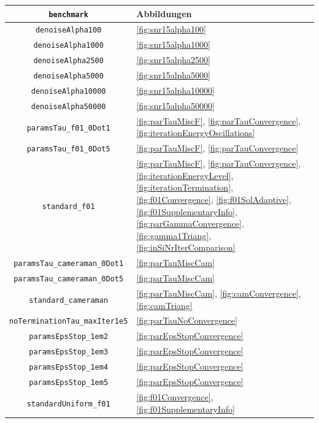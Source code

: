 \begin{table}[p]
  \centering
  \begin{tabular}{c|p{8.7cm}}
    \hline
    \texttt{benchmark} & Abbildungen\\  
    \hline 
    \texttt{denoiseAlpha100} &
    \ref{fig:snr15alpha100}\\
    \texttt{denoiseAlpha1000} &
    \ref{fig:snr15alpha1000}\\
    \texttt{denoiseAlpha2500} &
    \ref{fig:snr15alpha2500}\\
    \texttt{denoiseAlpha5000} &
    \ref{fig:snr15alpha5000}\\
    \texttt{denoiseAlpha10000} &
    \ref{fig:snr15alpha10000}\\
    \texttt{denoiseAlpha50000} &
    \ref{fig:snr15alpha50000}\\
    \texttt{paramsTau\_f01\_0Dot1} &
    \ref{fig:parTauMiscF}, \ref{fig:parTauConvergence},
    \ref{fig:iterationEnergyOscillations}\\
    \texttt{paramsTau\_f01\_0Dot5} &
    \ref{fig:parTauMiscF}, \ref{fig:parTauConvergence}\\
    \texttt{standard\_f01} &
    \ref{fig:parTauMiscF}, \ref{fig:parTauConvergence}, 
    \ref{fig:iterationEnergyLevel}, \ref{fig:iterationTermination},
    \ref{fig:f01Convergence}, \ref{fig:f01SolAdaptive},
    \ref{fig:f01SupplementaryInfo}, \ref{fig:parGammaConvergence},
    \ref{fig:gamma1Triang}, \ref{fig:inSiNrIterComparison}\\
    \texttt{paramsTau\_cameraman\_0Dot1} &
    \ref{fig:parTauMiscCam}\\
    \texttt{paramsTau\_cameraman\_0Dot5} &
    \ref{fig:parTauMiscCam} \\
    \texttt{standard\_cameraman} &
    \ref{fig:parTauMiscCam}, \ref{fig:camConvergence}, \ref{fig:camTriang}\\
    \texttt{noTerminationTau\_maxIter1e5} &
    \ref{fig:parTauNoConvergence}\\
    \texttt{paramsEpsStop\_1em2} &
    \ref{fig:parEpsStopConvergence}\\
    \texttt{paramsEpsStop\_1em3} &
    \ref{fig:parEpsStopConvergence}\\
    \texttt{paramsEpsStop\_1em4} &
    \ref{fig:parEpsStopConvergence}\\
    \texttt{paramsEpsStop\_1em5} &
    \ref{fig:parEpsStopConvergence}\\
    \texttt{standardUniform\_f01} &
    \ref{fig:f01Convergence}, \ref{fig:f01SupplementaryInfo}\\

\end{tabular}
\end{table}
